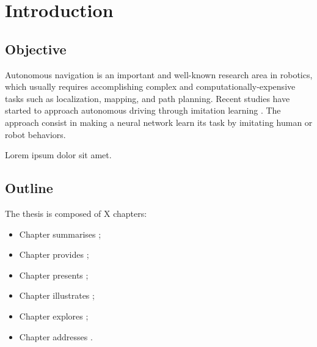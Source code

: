 \chapter{Introduction}
\label{chap:intro}






\section{Objective}
\label{sec:objective}

Autonomous navigation is an important and well-known research area in robotics, which usually requires accomplishing complex and computationally-expensive tasks such as localization, mapping, and path planning. Recent studies have started to approach autonomous driving through imitation learning \cite{imitation_learning_survey}. The approach consist in making a neural network learn its task by imitating human or robot behaviors.

Lorem ipsum dolor sit amet.




\section{Outline}
\label{sec:outline}

The thesis is composed of X chapters:
\begin{itemize}
	\item Chapter summarises ;
	
	\item Chapter provides ;
	
	\item Chapter presents ;
		
	\item Chapter illustrates ;

	\item Chapter explores ;	
	
	\item Chapter addresses .
\end{itemize}





